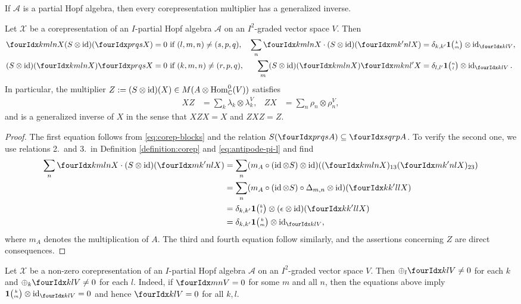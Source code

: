 If $\mathscr{A}$ is a partial Hopf algebra,  then every
corepresentation multiplier has a generalized inverse.
\begin{Lem} \label{lemma:corep-invertible}
  Let $\mathscr{X}$ be a corepresentation of an $I$-partial Hopf
  algebra $\mathscr{A}$ on an $I^{2}$-graded vector space $V$. Then
  \begin{align*}
    \Gr{X}{k}{l}{m}{n}  (S \otimes
      \id)(\Gr{X}{p}{q}{r}{s}) &=0 \text{ if } (l,m,n)\neq(s,p,q), &
      \sum_{n} \Gr{X}{k}{l}{m}{n} \cdot (S \otimes
      \id)(\Gr{X}{m}{n}{k'}{l}) &= \delta_{k,k'}\UnitC{k}{m} \otimes
      \id_{\Gru{V}{k}{l}}, \\
      (S \otimes \id)(\Gr{X}{k}{l}{m}{n}) \Gr{X}{p}{q}{r}{s} &= 0
      \text{ if } (k,m,n)\neq (r,p,q), & \sum_{m}
      (S \otimes \id)(\Gr{X}{k}{l}{m}{n}) \Gr{X}{m}{n}{k}{l'} &=
      \delta_{l,l'} \UnitC{n}{l} \otimes \id_{\Gru{V}{k}{l}}.
  \end{align*}
  In particular, the multiplier $Z:=     (S \otimes
  \operatorname{id})(X) \in M(A \otimes \operatorname{Hom}_{\mathbb{C}}^{0}(V))$
  satisfies
  \begin{align} \label{eq:corep-generalized-inverse}
    XZ &= \sum_{k} \lambda_{k} \otimes \lambda^{V}_{k}, &
    ZX &= \sum_{n} \rho_{n} \otimes \rho^{V}_{n},
  \end{align}
  and is a generalized inverse of $X$ in the sense that $XZX=X$ and $ZXZ=Z$.
\end{Lem}
\begin{proof}
  The first equation follows from \eqref{eq:corep-blocks} and the
  relation  $S(\Gr{A}{p}{q}{r}{s})\subseteq \Gr{A}{s}{r}{q}{p}$. To
  verify the second one, we use relations 2.\ and 3.\ in Definition
  \ref{definition:corep} and \eqref{eq:antipode-pi-l} and find
  \begin{align*}
      \sum_{n} \Gr{X}{k}{l}{m}{n} \cdot (S \otimes
      \id)(\Gr{X}{m}{n}{k'}{l}) &= \sum_{n} (m_{A} \circ (\id \otimes S)
      \otimes \id)((\Gr{X}{k}{l}{m}{n})_{13}(\Gr{X}{m}{n}{k'}{l})_{23})
 \\ &= \sum_{n} (m_{A} \circ (\id \otimes S) \circ \Delta_{m,n} \otimes
      \id)(\Gr{X}{k}{l}{k'}{l}) \\
      &= \delta_{k,k'} \UnitC{k}{l} \otimes (\epsilon \otimes
      \id)(\Gr{X}{k}{l}{k'}{l})
      \\ &=
\delta_{k,k'}\UnitC{k}{m} \otimes
      \id_{\Gru{V}{k}{l}},  \end{align*}
where $m_{A}$ denotes the multiplication of $A$. The third and fourth
equation follow similarly, and the assertions concerning $Z$ are
direct consequences.
\end{proof}
\begin{Rem}
  Let $\mathscr{X}$ be a non-zero corepresentation of an $I$-partial
  Hopf algebra $\mathscr{A}$ on an $I^{2}$-graded vector space $V$.
  Then $\oplus_{l} \Gru{V}{k}{l}\neq 0$ for each $k$ and
  $\oplus_{k} \Gru{V}{k}{l}\neq 0$ for each $l$. Indeed, if
  $\Gru{V}{m}{n} = 0$ for some $m$ and all $n$, then the equations
  above imply $\UnitC{k}{m} \otimes \id_{\Gru{V}{k}{l}}=0$ and hence
  $\Gru{V}{k}{l}=0$ for all $k,l$.
\end{Rem}

